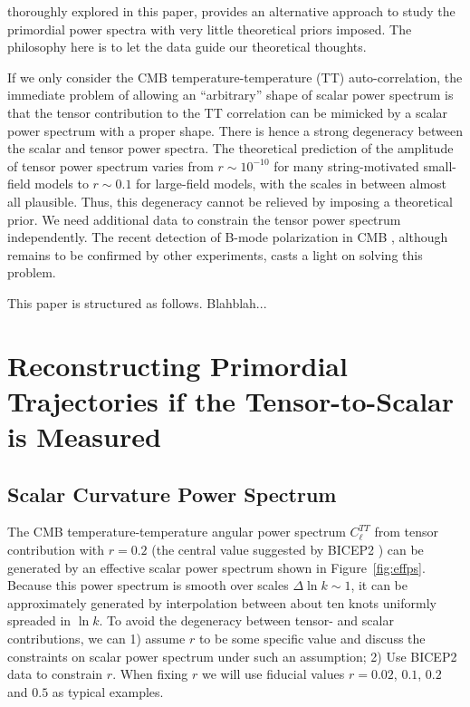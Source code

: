 \documentclass[11pt]{article}
\begin{document}
thoroughly explored in this paper, provides an alternative approach to study the primordial power spectra with very little theoretical priors imposed. The philosophy here is to let the data guide our theoretical thoughts.

If we only consider the CMB temperature-temperature (TT) auto-correlation, the immediate problem of allowing an ``arbitrary'' shape of scalar power spectrum is that the tensor contribution to the TT correlation can be mimicked by a scalar power spectrum with a proper shape. There is hence a strong degeneracy between the scalar and tensor power spectra. The theoretical prediction of the amplitude of tensor power spectrum varies from $r\sim 10^{-10}$ for many string-motivated small-field models to  $r\sim 0.1$ for large-field models, with the scales in between almost all plausible. Thus, this degeneracy cannot be relieved by imposing a theoretical prior. We need additional data to constrain the tensor power spectrum independently. The recent detection of B-mode polarization in CMB \cite{BICEP2}, although remains to be confirmed by other experiments, casts a light on solving this problem.

This paper is structured as follows. Blahblah...

\section{Reconstructing Primordial Trajectories if the Tensor-to-Scalar  is Measured}

\subsection{Scalar Curvature Power Spectrum }

The CMB temperature-temperature angular power spectrum $C_\ell^{TT}$ from tensor contribution with $r=0.2$ (the central value suggested by BICEP2 \cite{BICEP2}) can be generated by an effective scalar power spectrum shown in Figure~\ref{fig:effps}. Because this power spectrum is smooth over scales $\Delta\ln k \sim 1$, it can be approximately generated by interpolation between about ten knots uniformly spreaded in $\ln k$. To avoid the degeneracy between tensor- and scalar contributions, we can 1) assume $r$ to be some specific value and discuss the constraints on scalar power spectrum under such an assumption; 2) Use BICEP2 data to constrain $r$. When fixing $r$ we will use fiducial values $r=0.02$, $0.1$, $0.2$ and $0.5$ as typical examples. 
\end{document}
